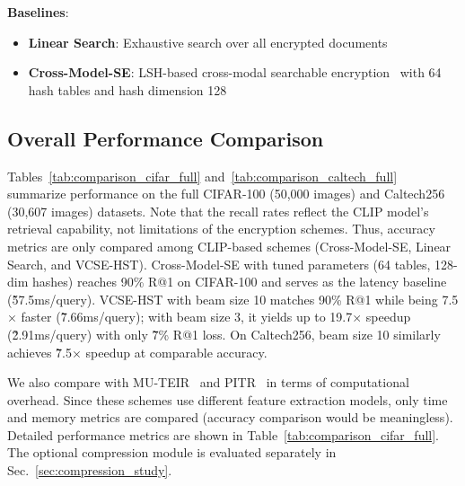 \documentclass[journal]{IEEEtran}
\begin{document}
\textbf{Baselines}:
\begin{itemize}
    \item \textbf{Linear Search}: Exhaustive search over all encrypted documents
    \item \textbf{Cross-Model-SE}: LSH-based cross-modal searchable encryption~\cite{yang2025secure} with 64 hash tables and hash dimension 128
\end{itemize}

\vspace{2pt}

\subsection{Overall Performance Comparison}

Tables~\ref{tab:comparison_cifar_full} and~\ref{tab:comparison_caltech_full} summarize performance on the full CIFAR-100 (50{,}000 images) and Caltech256 (30{,}607 images) datasets. Note that the recall rates reflect the CLIP model's retrieval capability, not limitations of the encryption schemes. Thus, accuracy metrics are only compared among CLIP-based schemes (Cross-Model-SE, Linear Search, and VCSE-HST). Cross-Model-SE with tuned parameters (64 tables, 128-dim hashes) reaches 90\% R@1 on CIFAR-100 and serves as the latency baseline (\~57.5ms/query). VCSE-HST with beam size 10 matches 90\% R@1 while being 7.5$\times$ faster (\~7.66ms/query); with beam size 3, it yields up to 19.7$\times$ speedup (\~2.91ms/query) with only \~7\% R@1 loss. On Caltech256, beam size 10 similarly achieves \~7.5$\times$ speedup at comparable accuracy.

We also compare with MU-TEIR~\cite{yang2022mu} and PITR~\cite{zhang2024efficient} in terms of computational overhead. Since these schemes use different feature extraction models, only time and memory metrics are compared (accuracy comparison would be meaningless). Detailed performance metrics are shown in Table~\ref{tab:comparison_cifar_full}. The optional compression module is evaluated separately in Sec.~\ref{sec:compression_study}.
\end{document}
